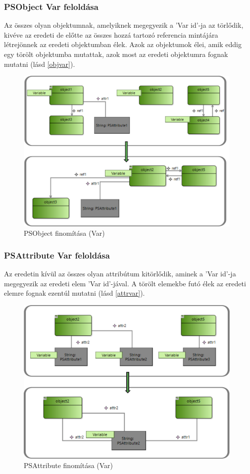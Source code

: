 \subsubsection{PSObject Var feloldása}
 Az összes olyan objektumnak, amelyiknek megegyezik a 'Var id'-ja az törlődik, kivéve az eredeti de előtte az összes hozzá tartozó referencia mintájára létrejönnek az eredeti objektumban élek. Azok az objektumok élei, amik eddig egy törölt objektumba mutattak, azok most az eredeti objektumra fognak mutatni (lásd \autoref{objvar}).
\begin{figure}[!ht]
	\centering
	\includegraphics[width=110mm]{figures/objvar.pdf}
	\caption{PSObject finomítása (Var)}
	\label{objvar} 
\end{figure}

\subsubsection{PSAttribute Var feloldása}
Az eredetin kívül az összes olyan attribútum kitörlődik, aminek a 'Var id'-ja megegyezik az eredeti elem 'Var id'-jával. A törölt elemekbe futó élek az eredeti elemre fognak ezentúl mutatni (lásd \autoref{attrvar}).
\begin{figure}[!ht]
	\centering
	\includegraphics[width=110mm]{figures/attrvar.pdf}
	\caption{PSAttribute finomítása (Var)}
	\label{attrvar} 
\end{figure}

